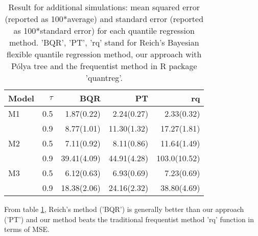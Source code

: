 \documentclass[12pt]{article}
\newcommand{\polya}{P\'{o}lya}
\begin{document}
\begin{table}[htbp]\label{tab:add}
\caption[]{ Result for additional simulations: mean squared error
  (reported as 100*average) and standard error (reported as
  100*standard error) for each quantile regression method. 'BQR',
  'PT', 'rq' stand for Reich's Bayesian flexible quantile regression
  method, our approach with \polya{} tree and the frequentist method
  in R package 'quantreg'. }
\vspace{4mm}

\centering
\begin{tabular}[tb]{l|r|r|r|r}
Model & $\tau$ & BQR         & PT          & rq           \\
\hline
M1    & 0.5    & 1.87(0.22)  & 2.24(0.27)  & 2.33(0.32)   \\
      & 0.9    & 8.77(1.01)  & 11.30(1.32) & 17.27(1.81)  \\
M2    & 0.5    & 7.11(0.92)  & 8.11(0.86)  & 11.64(1.49)  \\
      & 0.9    & 39.41(4.09) & 44.91(4.28) & 103.0(10.52) \\
M3    & 0.5    & 6.12(0.63)  & 6.93(0.69)  & 7.23(0.69)   \\
      & 0.9    & 18.38(2.06) & 24.16(2.32) & 38.80(4.69) 
\end{tabular}
\end{table}

From table \ref{tab:add}, Reich's method ('BQR') is generally better
than our approach ('PT') and our method beats the traditional
frequentist method 'rq' function in terms of MSE. 
\end{document}
